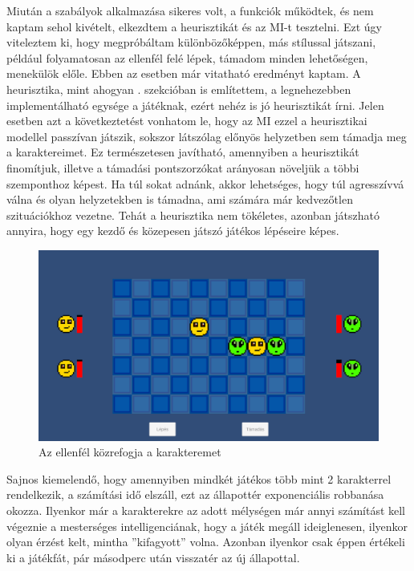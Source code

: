 \documentclass[
]{thesis-ekf}
\theoremstyle{definition}
\theoremstyle{remark}
\begin{document}
Miután a szabályok alkalmazása sikeres volt, a funkciók működtek, és nem kaptam sehol kivételt, elkezdtem a heurisztikát és az MI-t tesztelni. Ezt úgy viteleztem ki, hogy megpróbáltam különbözőképpen, más stílussal játszani, például folyamatosan az ellenfél felé lépek, támadom minden lehetőségen, menekülök előle. Ebben az esetben már vitatható eredményt kaptam. A heurisztika, mint ahogyan . szekcióban is említettem, a legnehezebben implementálható egysége a játéknak, ezért nehéz is jó heurisztikát írni. Jelen esetben azt a következtetést vonhatom le, hogy az MI ezzel a heurisztikai modellel passzívan játszik, sokszor látszólag előnyös helyzetben sem támadja meg a karaktereimet. Ez természetesen javítható, amennyiben a heurisztikát finomítjuk, illetve a támadási pontszorzókat arányosan növeljük a többi szemponthoz képest. Ha túl sokat adnánk, akkor lehetséges, hogy túl agresszívvá válna és olyan helyzetekben is támadna, ami számára már kedvezőtlen szituációkhoz vezetne. Tehát a heurisztika nem tökéletes, azonban játszható annyira, hogy egy kezdő és közepesen játszó játékos lépéseire képes.

\begin{figure}[h!]
	\centering
	\includegraphics[width=16cm]{./pictures/game_situation2.png}
	\caption{Az ellenfél közrefogja a karakteremet}
	\label{game-situation-2}
\end{figure}

Sajnos kiemelendő, hogy amennyiben mindkét játékos több mint 2 karakterrel rendelkezik, a számítási idő elszáll, ezt az állapottér exponenciális robbanása okozza. Ilyenkor már a karakterekre az adott mélységen már annyi számítást kell végeznie a mesterséges intelligenciának, hogy a játék megáll ideiglenesen, ilyenkor olyan érzést kelt, mintha ''kifagyott'' volna. Azonban ilyenkor csak éppen értékeli ki a játékfát, pár másodperc után visszatér az új állapottal.
\end{document}
